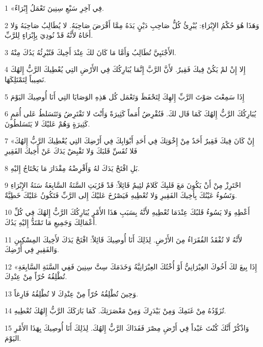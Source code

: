 \par 1 «فِي آخِرِ سَبْعِ سِنِينَ تَعْمَلُ إِبْرَاءً.
\par 2 وَهَذَا هُوَ حُكْمُ الإِبْرَاءِ: يُبْرِئُ كُلُّ صَاحِبِ دَيْنٍ يَدَهُ مِمَّا أَقْرَضَ صَاحِبَهُ. لا يُطَالِبُ صَاحِبَهُ وَلا أَخَاهُ لأَنَّهُ قَدْ نُودِيَ بِإِبْرَاءٍ لِلرَّبِّ.
\par 3 الأَجْنَبِيَّ تُطَالِبُ وَأَمَّا مَا كَانَ لكَ عِنْدَ أَخِيكَ فَتُبْرِئُهُ يَدُكَ مِنْهُ.
\par 4 إِلا إِنْ لمْ يَكُنْ فِيكَ فَقِيرٌ. لأَنَّ الرَّبَّ إِنَّمَا يُبَارِكُكَ فِي الأَرْضِ التِي يُعْطِيكَ الرَّبُّ إِلهُكَ نَصِيباً لِتَمْتَلِكَهَا.
\par 5 إِذَا سَمِعْتَ صَوْتَ الرَّبِّ إِلهِكَ لِتَحْفَظَ وَتَعْمَل كُل هَذِهِ الوَصَايَا التِي أَنَا أُوصِيكَ اليَوْمَ
\par 6 يُبَارِكُكَ الرَّبُّ إِلهُكَ كَمَا قَال لكَ. فَتُقْرِضُ أُمَماً كَثِيرَةً وَأَنْتَ لا تَقْتَرِضُ وَتَتَسَلطُ عَلى أُمَمٍ كَثِيرَةٍ وَهُمْ عَليْكَ لا يَتَسَلطُونَ.
\par 7 «إِنْ كَانَ فِيكَ فَقِيرٌ أَحَدٌ مِنْ إِخْوَتِكَ فِي أَحَدِ أَبْوَابِكَ فِي أَرْضِكَ التِي يُعْطِيكَ الرَّبُّ إِلهُكَ فَلا تُقَسِّ قَلبَكَ وَلا تَقْبِضْ يَدَكَ عَنْ أَخِيكَ الفَقِيرِ
\par 8 بَلِ افْتَحْ يَدَكَ لهُ وَأَقْرِضْهُ مِقْدَارَ مَا يَحْتَاجُ إِليْهِ.
\par 9 احْتَرِزْ مِنْ أَنْ يَكُونَ مَعَ قَلبِكَ كَلامٌ لئِيمٌ قَائِلاً: قَدْ قَرُبَتِ السَّنَةُ السَّابِعَةُ سَنَةُ الإِبْرَاءِ وَتَسُوءُ عَيْنُكَ بِأَخِيكَ الفَقِيرِ وَلا تُعْطِيهِ فَيَصْرُخَ عَليْكَ إِلى الرَّبِّ فَتَكُونُ عَليْكَ خَطِيَّةٌ.
\par 10 أَعْطِهِ وَلا يَسُوءُ قَلبُكَ عِنْدَمَا تُعْطِيهِ لأَنَّهُ بِسَبَبِ هَذَا الأَمْرِ يُبَارِكُكَ الرَّبُّ إِلهُكَ فِي كُلِّ أَعْمَالِكَ وَجَمِيعِ مَا تَمْتَدُّ إِليْهِ يَدُكَ.
\par 11 لأَنَّهُ لا تُفْقَدُ الفُقَرَاءُ مِنَ الأَرْضِ. لِذَلِكَ أَنَا أُوصِيكَ قَائِلاً: افْتَحْ يَدَكَ لأَخِيكَ المِسْكِينِ وَالفَقِيرِ فِي أَرْضِكَ.
\par 12 «إِذَا بِيعَ لكَ أَخُوكَ العِبْرَانِيُّ أَوْ أُخْتُكَ العِبْرَانِيَّةُ وَخَدَمَكَ سِتَّ سِنِينَ فَفِي السَّنَةِ السَّابِعَةِ تُطْلِقُهُ حُرّاً مِنْ عِنْدِكَ.
\par 13 وَحِينَ تُطْلِقُهُ حُرّاً مِنْ عِنْدِكَ لا تُطْلِقُهُ فَارِغاً.
\par 14 تُزَوِّدُهُ مِنْ غَنَمِكَ وَمِنْ بَيْدَرِكَ وَمِنْ مَعْصَرَتِكَ. كَمَا بَارَكَكَ الرَّبُّ إِلهُكَ تُعْطِيهِ.
\par 15 وَاذْكُرْ أَنَّكَ كُنْتَ عَبْداً فِي أَرْضِ مِصْرَ فَفَدَاكَ الرَّبُّ إِلهُكَ. لِذَلِكَ أَنَا أُوصِيكَ بِهَذَا الأَمْرِ اليَوْمَ.
